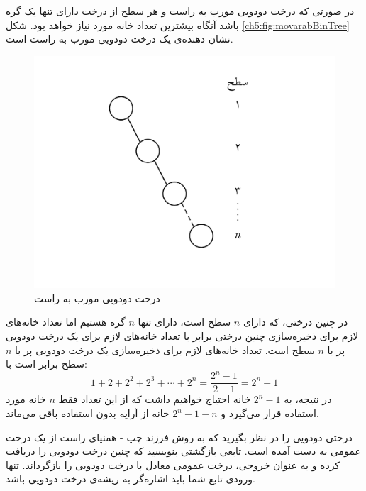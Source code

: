 
در صورتی که درخت دودویی مورب به راست و هر سطح از درخت دارای تنها یک گره باشد آنگاه بیشترین تعداد خانه مورد نیاز خواهد بود. شکل {\eqref{ch5:fig:movarabBinTree}} نشان دهنده‌ی یک درخت دودویی مورب به راست است.

\begin{figure}
\begin{center}
\includegraphics[scale=0.33]{figs/ch5/movarab_binary_tree.pdf}
\caption{درخت دودویی مورب به راست}\label{ch5:fig:movarabBinTree}
\end{center}
\end{figure}

در چنین درختی، که دارای {$n$} سطح است، دارای تنها {$n$} گره هستیم اما تعداد خانه‌های لازم برای ذخیره‌سازی چنین درختی برابر با تعداد خانه‌های لازم برای یک درخت دودویی پر با {$n$} سطح است. تعداد خانه‌های لازم برای ذخیره‌سازی یک درخت دودویی پر با {$n$} سطح برابر است با:
\begin{displaymath}
1+2+2^2+2^3+\cdots +2^n=\frac{2^n-1}{2-1}=2^n-1
\end{displaymath}
در نتیجه، به  {$2^n-1$} خانه احتیاج خواهیم داشت که از این تعداد فقط {$n$} خانه مورد استفاده قرار می‌گیرد و {$2^n-1-n$} خانه از آرایه بدون استفاده باقی می‌ماند.
 
 درختی دودویی را در نظر بگیرید که به روش فرزند چپ - همنیای راست از یک درخت عمومی به دست آمده است. تابعی بازگشتی بنویسید که چنین درخت دودویی را دریافت کرده و به عنوان خروجی، درخت عمومی معادل با درخت دودویی را بازگرداند. تنها ورودی تابع شما باید اشاره‌گر به ریشه‌ی درخت دودویی باشد.


